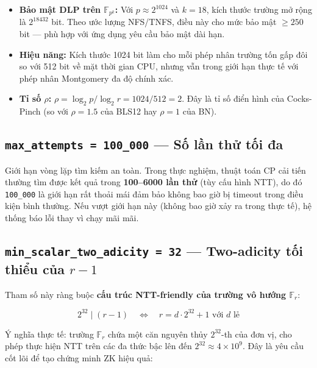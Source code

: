 \begin{itemize}
\tightlist
\item
  \textbf{Bảo mật DLP trên \(\mathbb{F}_{p^k}\):} Với
  \(p \approx 2^{1024}\) và \(k = 18\), kích thước trường mở rộng là
  \(2^{18432}\) bit. Theo ước lượng NFS/TNFS, điều này cho mức bảo mật
  \(\geq 250\) bit --- phù hợp với ứng dụng yêu cầu bảo mật dài hạn.
\item
  \textbf{Hiệu năng:} Kích thước 1024 bit làm cho mỗi phép nhân trường
  tốn gấp đôi so với 512 bit về mặt thời gian CPU, nhưng vẫn trong giới
  hạn thực tế với phép nhân Montgomery đa độ chính xác.
\item
  \textbf{Tỉ số \(\rho\):}
  \(\rho = \log_2 p / \log_2 r = 1024/512 = 2\). Đây là tỉ số điển hình
  của Cocks-Pinch (so với \(\rho = 1.5\) của BLS12 hay \(\rho = 1\) của
  BN).
\end{itemize}

\subsection{\texorpdfstring{\texttt{max\_attempts\ =\ 100\_000} --- Số
lần thử tối
đa}{max\_attempts = 100\_000 --- Số lần thử tối đa}}\label{max_attempts-100_000-sux1ed1-lux1ea7n-thux1eed-tux1ed1i-ux111a}

Giới hạn vòng lặp tìm kiếm an toàn. Trong thực nghiệm, thuật toán CP cải
tiến thường tìm được kết quả trong \textbf{100--6000 lần thử} (tùy cấu
hình NTT), do đó \texttt{100\_000} là giới hạn rất thoải mái đảm bảo
không bao giờ bị timeout trong điều kiện bình thường. Nếu vượt giới hạn
này (không bao giờ xảy ra trong thực tế), hệ thống báo lỗi thay vì chạy
mãi mãi.

\subsection{\texorpdfstring{\texttt{min\_scalar\_two\_adicity\ =\ 32}
--- Two-adicity tối thiểu của
\(r - 1\)}{min\_scalar\_two\_adicity = 32 --- Two-adicity tối thiểu của r - 1}}\label{min_scalar_two_adicity-32-two-adicity-tux1ed1i-thiux1ec3u-cux1ee7a-r---1}

Tham số này ràng buộc \textbf{cấu trúc NTT-friendly của trường vô hướng
\(\mathbb{F}_r\)}:

\[2^{32} \mid (r - 1) \quad \Longleftrightarrow \quad r = d \cdot 2^{32} + 1 \text{ với } d \text{ lẻ}\]

Ý nghĩa thực tế: trường \(\mathbb{F}_r\) chứa một căn nguyên thủy
\(2^{32}\)-th của đơn vị, cho phép thực hiện NTT trên các đa thức bậc
lên đến \(2^{32} \approx 4 \times 10^9\). Đây là yêu cầu cốt lõi để tạo
chứng minh ZK hiệu quả:

